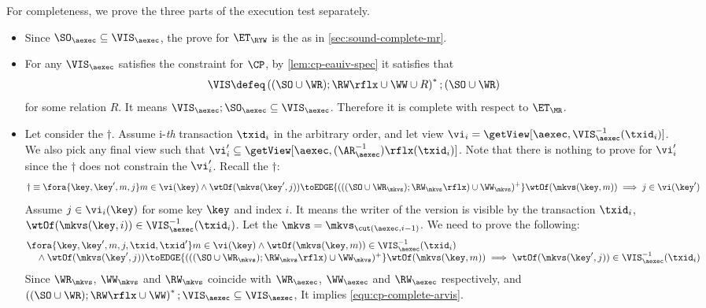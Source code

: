     
For completeness, we prove the three parts of the execution test separately.
\begin{itemize}
\item Since \( \SO_\aexec \subseteq \VIS_\aexec  \), the prove for \( \ET_\RYW \) is the as in \cref{sec:sound-complete-mr}.
\item For any \( \VIS_\aexec \)  satisfies the constraint for \( \CP \), by \cref{lem:cp-eauiv-spec} it satisfies that 
\[
    \VIS \defeq \left( (\SO \cup \WR ) ; \RW\rflx \cup \WW \cup R \right)^* ; (\SO \cup \WR )
\]
for some relation \( R \).
It means \( \VIS_\aexec ; \SO_\aexec \subseteq \VIS_\aexec \).
Therefore it is complete with respect to \( \ET_\MR \).

\item Let consider the \( \dagger \).
Assume i-\emph{th} transaction \( \txid_i \) in the arbitrary order,
and let view \( \vi_{i} = \getView[\aexec, \VIS^{-1}_{\aexec}(\txid_{i})] \).
We also pick any final view such that \( \vi'_{i} \subseteq \getView[\aexec, (\AR^{-1}_{\aexec})\rflx(\txid_{i})] \).
Note that there is nothing to prove for \( \vi'_i \) since the \( \dagger \) does not constrain the \( \vi'_i \).
Recall the \( \dagger \):
\[
\dagger  \equiv 
        \fora{\key, \key', m, j}
             m \in \vi(\key)  \land \wtOf(\mkvs(\key', j)) \toEDGE{(((\SO \cup \WR_{\mkvs}) ; \RW_{\mkvs}\rflx) \cup \WW_{\mkvs})^{+}} \wtOf(\mkvs(\key, m))
         \implies j \in \vi(\key')  
\]
Assume \( j \in \vi_i(\key) \) for some key \(\key \) and index \( i \).
It means the writer of the version is visible by the transaction \( \txid_i\),
\ie \( \wtOf(\mkvs(\key,i)) \in \VIS^{-1}_{\aexec}(\txid_{i}) \).
Let the \( \mkvs = \mkvs_{\cut(\aexec, i-1)} \).
We need to prove the following:
\begin{gather}
    \label{equ:cp-complete-arvis}
    \begin{array}{@{}l@{}}
        \fora{\key, \key', m, j, \txid, \txid'} 
        m \in \vi(\key) 
        \land \wtOf(\mkvs(\key,m)) \in \VIS_\aexec^{-1}(\txid_i) \\
        \quad {} \land \wtOf(\mkvs(\key', j)) \toEDGE{(((\SO \cup \WR_{\mkvs}) ; \RW_{\mkvs}\rflx) \cup \WW_{\mkvs})^{+}} \wtOf(\mkvs(\key, m)) 
            \implies \wtOf(\mkvs(\key',j)) \in \VIS_\aexec^{-1}(\txid_i)
    \end{array}
\end{gather}
Since \( \WR_\mkvs \), \( \WW_\mkvs \) and \( \RW_\mkvs \) coincide with
\( \WR_\aexec \), \( \WW_\aexec \) and \( \RW_\aexec \) respectively,
and \( \left( (\SO \cup \WR ) ; \RW\rflx \cup \WW \right)^* ; \VIS_\aexec \subseteq \VIS_\aexec \),
It implies \cref{equ:cp-complete-arvis}.
\end{itemize}
